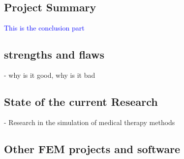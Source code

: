 \documentclass[parskip=half, titlepage=yes, 12pt, BCOR=12mm, DIV=calc]{scrartcl}
\begin{document}
\subsection{Project Summary}

\textcolor{blue}
{
This is the conclusion part
}

\subsection{strengths and flaws}
- why is it good, why is it bad

\subsection{State of the current Research}
- Research in the simulation of medical therapy methods \\

\subsection{Other FEM projects and software}


\newpage


\clearpage
\nocite{*}
\printbibliography

\newpage

\appendix

 
\end{document}
